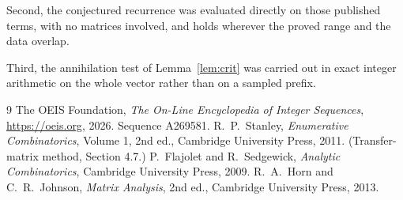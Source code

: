 \documentclass[11pt,a4paper]{article}
\theoremstyle{plain}
\theoremstyle{definition}
\begin{document}
Second, the conjectured recurrence was evaluated directly on those published terms, with no
matrices involved, and holds wherever the proved range and the data overlap.

Third, the annihilation test of Lemma~\ref{lem:crit} was carried out in exact integer
arithmetic on the whole vector rather than on a sampled prefix.

\begin{thebibliography}{9}
 The OEIS Foundation, \emph{The On-Line Encyclopedia of Integer
Sequences}, \url{https://oeis.org}, 2026. Sequence A269581.
 R.~P.~Stanley, \emph{Enumerative Combinatorics}, Volume 1, 2nd ed.,
Cambridge University Press, 2011. (Transfer-matrix method, Section 4.7.)
 P.~Flajolet and R.~Sedgewick, \emph{Analytic Combinatorics}, Cambridge
University Press, 2009.
 R.~A.~Horn and C.~R.~Johnson, \emph{Matrix Analysis}, 2nd ed., Cambridge
University Press, 2013.
\end{thebibliography}
\end{document}
